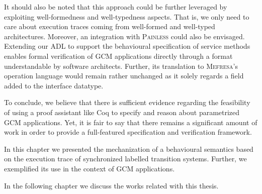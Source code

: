 		It should also be noted that this approach could be further leveraged 
	by exploiting well-formedness and well-typedness aspects. That is, we 
	only need to care about execution traces coming from well-formed and 
	well-typed architectures. Moreover, an integration with 
	\textsc{Painless} could also be envisaged. Extending our \ac{ADL}
	to support the behavioural
	specification of service methods enables formal verification	
	of \ac{GCM} applications directly through a format understandable by
	software architects. Further, its translation to
	\textsc{Mefresa}'s \textsf{operation} language would remain
	rather unchanged as it solely regards a field added to the \textsf{interface} datatype.
				
	
	To conclude, we believe that there is sufficient evidence regarding the
	feasibility of using a proof assistant like Coq to specify and reason
	about parametrized \ac{GCM} applications. Yet, it is fair to say that there 
	remains a significant amount of work in order to provide a full-featured
	specification and verification framework. 
	
	
	
		




\chapbreak

	In this chapter we presented the mechanization of a behavioural 
semantics based on the execution trace of synchronized labelled transition systems. Further, we
exemplified its use in the context of \ac{GCM} applications.
	
	In the following chapter we discuss the works related with this thesis.



